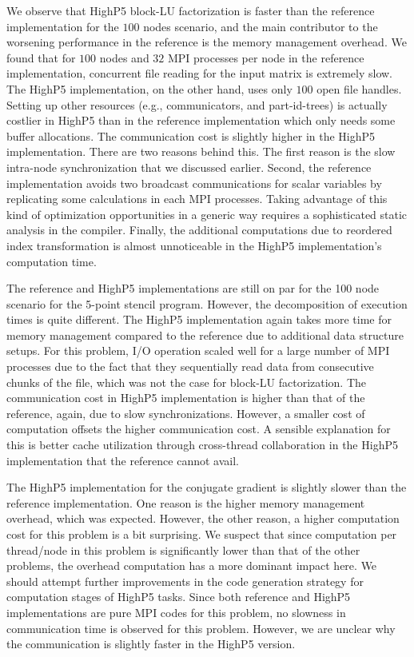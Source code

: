 \documentclass[ASNA,twocolumn]{USG} %
\begin{document}
{We observe that HighP5 block-LU factorization is faster than the reference implementation for the $100$ nodes scenario, and the main contributor to the worsening performance in the reference is the memory management overhead. We found that for $100$ nodes and $32$ MPI processes per node in the reference implementation, concurrent file reading for the input matrix is extremely slow. The HighP5 implementation, on the other hand, uses only $100$ open file handles. Setting up other resources (e.g., communicators, and part-id-trees) is actually costlier in HighP5 than in the reference implementation which only needs some buffer allocations. The communication cost is slightly higher in the HighP5 implementation. There are two reasons behind this. The first reason is the slow intra-node synchronization that we discussed earlier. Second, the reference implementation avoids two broadcast communications for scalar variables by replicating some calculations in each MPI processes. Taking advantage of this kind of optimization opportunities in a generic way requires a sophisticated static analysis in the compiler. Finally, the additional computations due to reordered index transformation is almost unnoticeable in the HighP5 implementation's computation time.     

The reference and HighP5 implementations are still on par for the 100 node scenario for the 5-point stencil program. However, the decomposition of execution times is quite different. The HighP5 implementation again takes more time for memory management compared to the reference due to additional data structure setups. For this problem, I/O operation scaled well for a large number of MPI processes due to the fact that they sequentially read data from consecutive chunks of the file, which was not the case for block-LU factorization. The communication cost in HighP5 implementation is higher than that of the reference, again, due to slow synchronizations. However, a smaller cost of computation offsets the higher communication cost. A sensible explanation for this is better cache utilization through cross-thread collaboration in the HighP5 implementation that the reference cannot avail.

The HighP5 implementation for the conjugate gradient is slightly slower than the reference implementation. One reason is the higher memory management overhead, which was expected. However, the other reason, a higher computation cost for this problem is a bit surprising. We suspect that since computation per thread/node in this problem is significantly lower than that of the other problems, the overhead computation has a more dominant impact here. We should attempt further improvements in the code generation strategy for computation stages of HighP5 tasks. Since both reference and HighP5 implementations are pure MPI codes for this problem, no slowness in communication time is observed for this problem. However, we are unclear why the communication is slightly faster in the HighP5 version.


}
\end{document}
